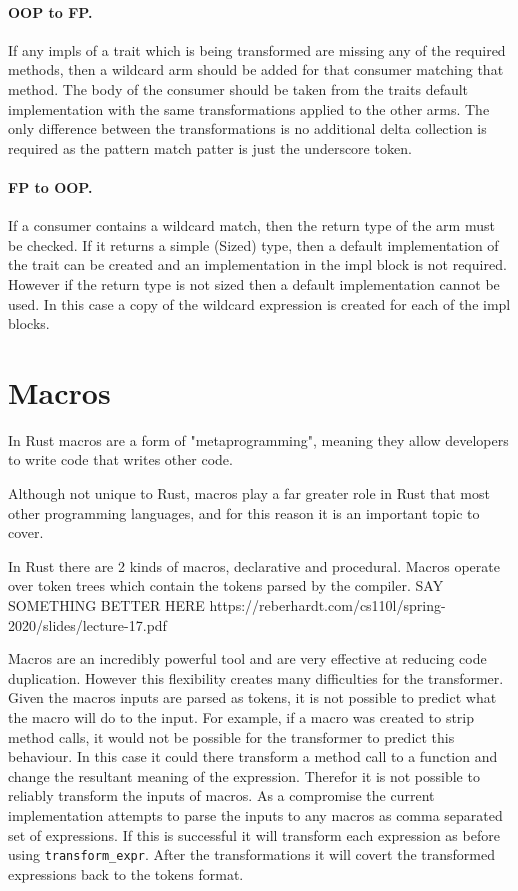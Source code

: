\documentclass[ oneside,%
                    author={James Elgar},
                    degree={MEng},
                     title={Bidirectional transformer between functional and \\ object-oriented programming in Rust},
                  subtitle={}]{dissertation}
\begin{document}
\paragraph{OOP to FP.} If any impls of a trait which is being transformed are missing any of the required methods, then a wildcard arm should be added for that consumer matching that method. The body of the consumer should be taken from the traits default implementation with the same transformations applied to the other arms. The only difference between the transformations is no additional delta collection is required as the pattern match patter is just the underscore token. 

\paragraph{FP to OOP.} If a consumer contains a wildcard match, then the return type of the arm must be checked. If it returns a simple (Sized) type, then a default implementation of the trait can be created and an implementation in the impl block is not required. However if the return type is not sized then a default implementation cannot be used. In this case a copy of the wildcard expression is created for each of the impl blocks. 

\section{Macros}

In Rust macros are a form of "metaprogramming", meaning they allow developers to write code that writes other code. 

Although not unique to Rust, macros play a far greater role in Rust that most other programming languages, and for this reason it is an important topic to cover. 

In Rust there are 2 kinds of macros, declarative and procedural. Macros operate over token trees which contain the tokens parsed by the compiler. SAY SOMETHING BETTER HERE  https://reberhardt.com/cs110l/spring-2020/slides/lecture-17.pdf

Macros are an incredibly powerful tool and are very effective at reducing code duplication. However this flexibility creates many difficulties for the transformer. Given the macros inputs are parsed as tokens, it is not possible to predict what the macro will do to the input. For example, if a macro was created to strip method calls, it would not be possible for the transformer to predict this behaviour. In this case it could there transform a method call to a function and change the resultant meaning of the expression. 
Therefor it is not possible to reliably transform the inputs of macros. As a compromise the current implementation attempts to parse the inputs to any macros as comma separated set of expressions. If this is successful it will transform each expression as before using \verb|transform_expr|. After the transformations it will covert the transformed expressions back to the tokens format.
\end{document}

